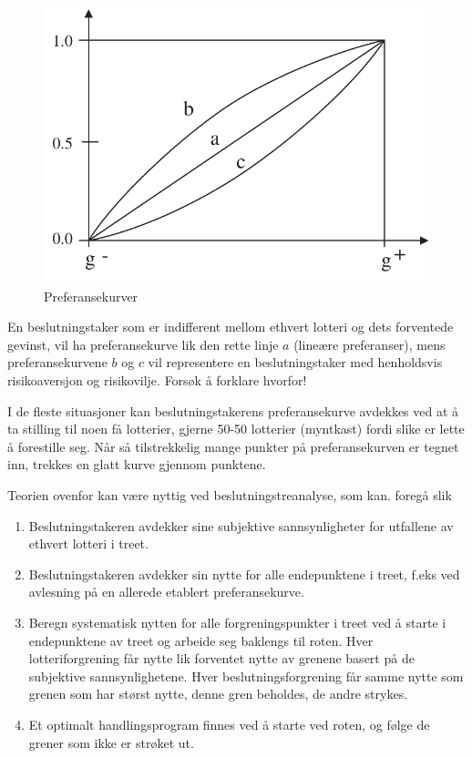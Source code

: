{{\begin{figure}[ht]
\centering
	\includegraphics[scale=1.0]{figurer/fig16_16.pdf} 
\caption{Preferansekurver}
	\label{fig:prefkurve16}
\end{figure}

En beslutningstaker som er indifferent mellom ethvert lotteri og dets
forventede gevinst, vil ha preferansekurve lik den rette linje $a$
(lineære preferanser), mens preferansekurvene $b$ og $c$ vil 
representere en beslutningstaker med henholdsvis risikoaversjon og 
risikovilje.  Forsøk å forklare hvorfor!

I de fleste situasjoner kan beslutningstakerens preferansekurve avdekkes
ved at å ta stilling til noen få lotterier, gjerne 50-50 lotterier
(myntkast) fordi slike er lette å forestille seg.  Når så
tilstrekkelig mange punkter på preferansekurven er tegnet inn, trekkes
en glatt kurve gjennom punktene.

Teorien ovenfor kan være nyttig ved beslutningstreanalyse, som kan.
foregå slik

\begin{enumerate}
\item Beslutningstakeren avdekker sine subjektive sannsynligheter for
      utfallene av ethvert lotteri i treet. 
\item Beslutningstakeren avdekker sin nytte for alle endepunktene i treet,
      f.eks ved avlesning på en allerede etablert preferansekurve.
\item Beregn systematisk nytten for alle forgreningspunkter i treet ved å
      starte i endepunktene av treet og arbeide seg baklengs til roten.
      Hver lotteriforgrening får nytte lik forventet nytte av grenene
      basert på de subjektive sannsynlighetene. Hver beslutningsforgrening
      får samme nytte som grenen som har størst nytte, 
      denne gren beholdes, de andre strykes.
\item Et optimalt handlingsprogram finnes ved å starte ved roten, og
      følge de grener som ikke er strøket ut.
\end{enumerate}



}}
